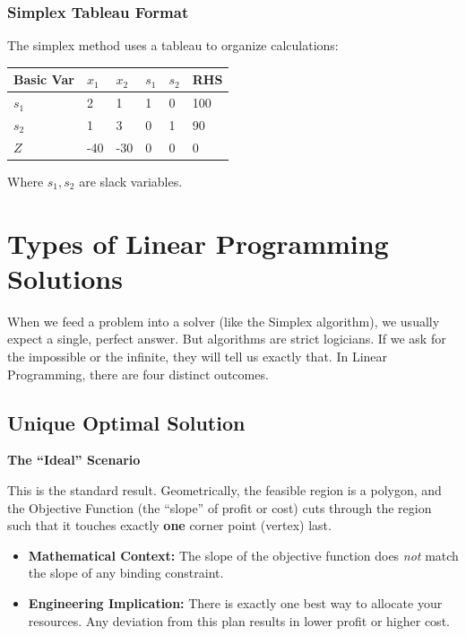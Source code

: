 \documentclass[
  letterpaper,
  DIV=11,
  numbers=noendperiod]{scrreprt}
\providecommand{\tightlist}{%
  \setlength{\itemsep}{0pt}\setlength{\parskip}{0pt}}
\begin{document}
\subsubsection{Simplex Tableau Format}\label{simplex-tableau-format}

The simplex method uses a tableau to organize calculations:

\begin{longtable}[]{@{}llllll@{}}
\toprule\noalign{}
Basic Var & \(x_1\) & \(x_2\) & \(s_1\) & \(s_2\) & RHS \\
\midrule\noalign{}
\endhead
\bottomrule\noalign{}
\endlastfoot
\(s_1\) & 2 & 1 & 1 & 0 & 100 \\
\(s_2\) & 1 & 3 & 0 & 1 & 90 \\
\(Z\) & -40 & -30 & 0 & 0 & 0 \\
\end{longtable}

Where \(s_1, s_2\) are slack variables.

\section{Types of Linear Programming
Solutions}\label{types-of-linear-programming-solutions}

When we feed a problem into a solver (like the Simplex algorithm), we
usually expect a single, perfect answer. But algorithms are strict
logicians. If we ask for the impossible or the infinite, they will tell
us exactly that. In Linear Programming, there are four distinct
outcomes.

\subsection{Unique Optimal Solution}\label{unique-optimal-solution}

\textbf{The ``Ideal'' Scenario}

This is the standard result. Geometrically, the feasible region is a
polygon, and the Objective Function (the ``slope'' of profit or cost)
cuts through the region such that it touches exactly \textbf{one} corner
point (vertex) last.

\begin{itemize}
\tightlist
\item
  \textbf{Mathematical Context:} The slope of the objective function
  does \emph{not} match the slope of any binding constraint.
\item
  \textbf{Engineering Implication:} There is exactly one best way to
  allocate your resources. Any deviation from this plan results in lower
  profit or higher cost.
\end{itemize}
\end{document}
